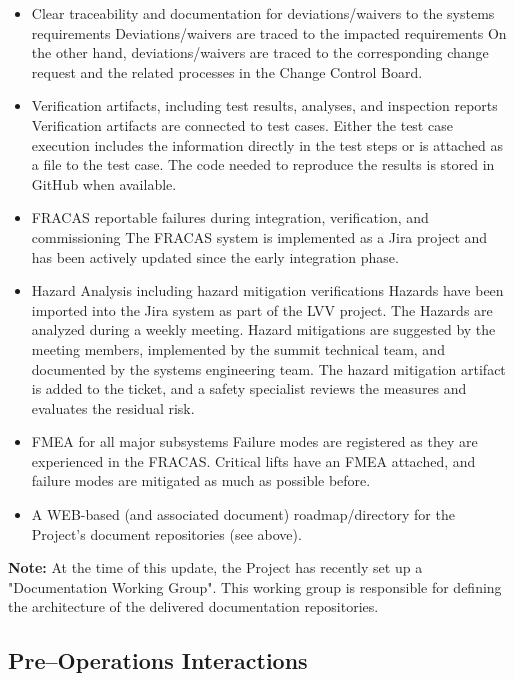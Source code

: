 \begin{itemize}
\begin{itemize}
		\item Clear traceability and documentation for deviations/waivers to the systems requirements
		 Deviations/waivers are traced to the impacted requirements 
		 On the other hand, deviations/waivers are traced to the corresponding change request and the related processes in the Change Control Board.
		 
		\item Verification artifacts, including test results, analyses, and inspection reports
		Verification artifacts are connected to test cases. 
		Either the test case execution includes the information directly in the test steps or is attached as a file to the test case.
		The code needed to reproduce the results is stored in GitHub when available.
				
		\item FRACAS reportable failures during integration, verification, and commissioning
		The FRACAS system is implemented as a Jira project and has been actively updated since the early integration phase.
		
		\item Hazard Analysis including hazard mitigation verifications
		Hazards have been imported into the Jira system as part of the LVV project.  The Hazards are analyzed during a weekly meeting.  
		Hazard mitigations are suggested by the meeting members, implemented by the summit technical team, and documented by the systems engineering team. 
		The hazard mitigation artifact is added to the ticket, and a safety specialist reviews the measures and evaluates the residual risk. 
		
		\item FMEA for all major subsystems
		Failure modes are registered as they are experienced in the FRACAS. 
		Critical lifts have an FMEA attached, and failure modes are mitigated as much as possible before.
		
	\item A WEB-based (and associated document) roadmap/directory for the Project's document repositories (see above).
	
\end{itemize}

{\bf Note:} At the time of this update, the Project has recently set up a "Documentation Working Group".  This working group is responsible for defining the architecture of the delivered documentation repositories.

\subsection{Pre--Operations Interactions}


\end{itemize}

